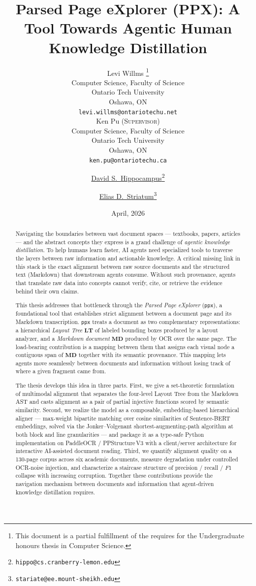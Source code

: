 \documentclass{article}
\title{Parsed Page eXplorer (PPX): A Tool Towards Agentic Human Knowledge Distillation}
\date{April, 2026}
\author{
  {Levi Willms}
  \thanks{
    This document is a partial fulfillment of the requires for the Undergraduate honours thesis in Computer Science.
  } \\
  Computer Science, Faculty of Science\\
  Ontario Tech University\\
  Oshawa, ON \\
  \texttt{levi.willms@ontariotechu.net} \\
  \And
  {Ken Pu (\textsc{Supervisor})} \\
  Computer Science, Faculty of Science\\
  Ontario Tech University\\
  Oshawa, ON \\
  \texttt{ken.pu@ontariotechu.ca} \\
}
\author[1]{%
  \href{https://orcid.org/0000-0000-0000-0000}{\usebox{\orcid}\hspace{1mm}David S.~Hippocampus\thanks{\texttt{hippo@cs.cranberry-lemon.edu}}}%
}
\author[1,2]{%
  \href{https://orcid.org/0000-0000-0000-0000}{\usebox{\orcid}\hspace{1mm}Elias D.~Striatum\thanks{\texttt{stariate@ee.mount-sheikh.edu}}}%
}
\affil[1]{Department of Computer Science, Cranberry-Lemon University, Pittsburgh, PA 15213}
\affil[2]{Department of Electrical Engineering, Mount-Sheikh University, Santa Narimana, Levand}
\theoremstyle{definition}
\newcommand{\LT}{\mathbf{LT}}
\newcommand{\MD}{\mathbf{MD}}
\begin{document}
\maketitle

\begin{abstract}
      Navigating the boundaries between vast document spaces ---
      textbooks, papers, articles --- and the abstract concepts they
      express is a grand challenge of \emph{agentic knowledge
            distillation}.  To help humans learn faster, AI agents need
      specialized tools to traverse the layers between raw information
      and actionable knowledge.  A critical missing link in this stack
      is the exact alignment between raw source documents and the
      structured text (Markdown) that downstream agents consume.
      Without such provenance, agents that translate raw data into
      concepts cannot verify, cite, or retrieve the evidence behind
      their own claims.

      This thesis addresses that bottleneck through the \emph{Parsed
            Page eXplorer} (\texttt{ppx}), a foundational tool that
      establishes strict alignment between a document page and its
      Markdown transcription.  \texttt{ppx} treats a document as two
      complementary representations: a hierarchical \emph{Layout Tree}
      $\LT$ of labeled bounding boxes produced by a layout analyzer,
      and a \emph{Markdown document} $\MD$ produced by OCR over the
      same page.  The load-bearing contribution is a mapping between
      them that assigns each visual node a contiguous span of $\MD$
      together with its semantic provenance.  This mapping lets agents
      move seamlessly between documents and information without losing
      track of where a given fragment came from.

      The thesis develops this idea in three parts.  First, we give a
      set-theoretic formulation of multimodal alignment that separates
      the four-level Layout Tree from the Markdown AST and casts
      alignment as a pair of partial injective functions scored by
      semantic similarity.  Second, we realize the model as a
      composable, embedding-based hierarchical aligner --- max-weight
      bipartite matching over cosine similarities of Sentence-BERT
      embeddings, solved via the Jonker--Volgenant
      shortest-augmenting-path algorithm at both block and line
      granularities --- and package it as a type-safe Python
      implementation on PaddleOCR / PPStructure\,V3 with a
      client/server architecture for interactive AI-assisted document
      reading.  Third, we quantify alignment quality on a 130-page
      corpus across six academic documents, measure degradation under
      controlled OCR-noise injection, and characterize a staircase
      structure of precision / recall / $F1$ collapse with increasing
      corruption.  Together these contributions provide the navigation
      mechanism between documents and information that agent-driven
      knowledge distillation requires.
\end{abstract}
\end{document}
